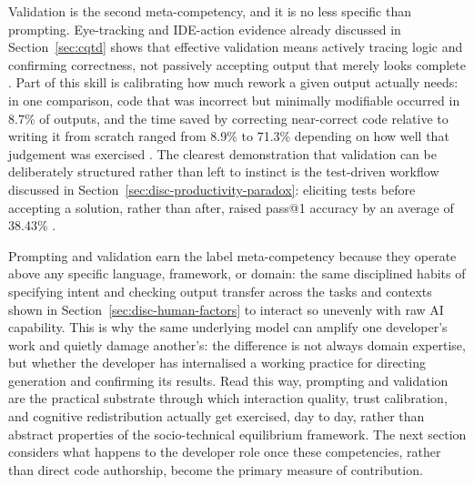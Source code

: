Validation is the second meta-competency, and it is no less specific than prompting. Eye-tracking and IDE-action evidence already discussed in Section~\ref{sec:cqtd} shows that effective validation means actively tracing logic and confirming correctness, not passively accepting output that merely looks complete \cite{tang_developer_2024}. Part of this skill is calibrating how much rework a given output actually needs: in one comparison, code that was incorrect but minimally modifiable occurred in 8.7\% of outputs, and the time saved by correcting near-correct code relative to writing it from scratch ranged from 8.9\% to 71.3\% depending on how well that judgement was exercised \cite{idrisov_program_2024}. The clearest demonstration that validation can be deliberately structured rather than left to instinct is the test-driven workflow discussed in Section~\ref{sec:disc-productivity-paradox}: eliciting tests before accepting a solution, rather than after, raised pass@1 accuracy by an average of 38.43\% \cite{fakhoury_llm-based_2024}.

Prompting and validation earn the label meta-competency because they operate above any specific language, framework, or domain: the same disciplined habits of specifying intent and checking output transfer across the tasks and contexts shown in Section~\ref{sec:disc-human-factors} to interact so unevenly with raw AI capability. This is why the same underlying model can amplify one developer's work and quietly damage another's: the difference is not always domain expertise, but whether the developer has internalised a working practice for directing generation and confirming its results. Read this way, prompting and validation are the practical substrate through which interaction quality, trust calibration, and cognitive redistribution actually get exercised, day to day, rather than abstract properties of the socio-technical equilibrium framework. The next section considers what happens to the developer role once these competencies, rather than direct code authorship, become the primary measure of contribution.


